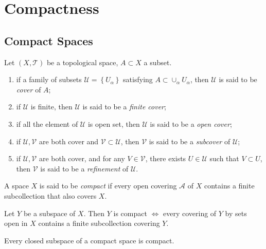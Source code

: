 \section{Compactness}

\subsection{Compact Spaces}

\begin{definition}
  Let \( (X, \mathcal{T}) \) be a topological space, \( A \subset X \) a subset.
  \begin{enumerate}
    \item if a family of subsets \( \mathcal{U} = \left\lbrace U_\alpha \right\rbrace \) satisfying \( A \subset \cup_\alpha U_\alpha \), then \( \mathcal{U} \) is said to be \emph{cover} of \( A \);
    \item if \( \mathcal{U} \) is finite, then \( \mathcal{U} \) is said to be a \emph{finite cover};
    \item if all the element of \( \mathcal{U} \) is open set, then \( \mathcal{U} \) is said to be a \emph{open cover};
    \item if \( \mathcal{U}, \mathcal{V} \) are both cover and \( \mathcal{V} \subset \mathcal{U} \), then \( \mathcal{V} \) is said to be a \emph{subcover} of \( \mathcal{U} \);
    \item if \( \mathcal{U}, \mathcal{V} \) are both cover, and for any \( V \in \mathcal{V} \), there exists \( U \in \mathcal{U} \) such that \( V \subset U \), then \( \mathcal{V} \) is said to be a \emph{refinement} of \( \mathcal{U} \).
  \end{enumerate}
\end{definition}

\begin{definition}
  A space \( X \) is said to be \emph{compact} if every open covering \( \mathcal{A} \) of \( X \) contains a finite subcollection that also covers \( X \).
\end{definition}

\begin{lemma}
  Let \( Y \) be a subspace of \( X \).
  Then \( Y \) is compact \( \iff \) every covering of \( Y \) by sets open in \( X \) contains a finite subcollection covering \( Y \).
\end{lemma}

\begin{theorem}
  Every closed subspace of a compact space is compact.
\end{theorem}


